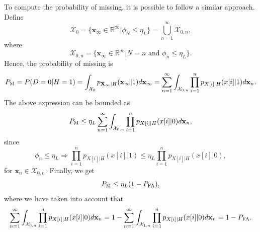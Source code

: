 To compute the probability of missing, it is possible to follow a similar approach. Define
\begin{equation*}
	\mathcal{X}_0 = \{ \mathbf{x}_{\infty} \in \mathbb{R}^{\infty} | \phi_{N} \leq  \eta_L  \} = \mathop{\bigcup}\limits_{n = 1}^{\infty} \mathcal{X}_{0,n},
\end{equation*}
where
\begin{equation*}
	\mathcal{X}_{0,n} = \{ \mathbf{x}_{\infty} \in \mathbb{R}^{\infty} |N = n \text{ and } \phi_{n} \leq  \eta_L  \}.
\end{equation*}
Hence, the probability of missing is
\begin{equation*}
	P_{\text{M}} = P(D = 0 | H = 1) = \int_{\mathcal{X}_0} p_{\mathbf{X}_{\infty} | H} (\mathbf{x}_{\infty} | 1) d \mathbf{x}_{\infty} = \sum_{n = 1}^{\infty}  \int_{\mathcal{X}_{0,n}} \prod_{i = 1}^{n} p_{X[i] | H}(x[i] | 1)  d \mathbf{x}_{n}.
\end{equation*}
The above expression can be bounded as
\begin{equation*}
	P_{\text{M}} \leq  \eta_L \sum_{n = 1}^{\infty}  \int_{\mathcal{X}_{0,n}}  \prod_{i = 1}^{n} p_{X[i] | H}(x[i] | 0)  d \mathbf{x}_{n},
\end{equation*}
since
\begin{equation*}
	\phi_n \leq \eta_L \Rightarrow   \prod_{i = 1}^{n} p_{X[i] | H}(x[i] | 1) \leq \eta_L \prod_{i = 1}^{n} p_{X[i] | H}(x[i] | 0),
\end{equation*}
for $\mathbf{x}_n \in \mathcal{X}_{0,n}$. Finally, we get
\begin{equation}
	\label{eq:bound_pm}
	P_{\text{M}} \leq  \eta_L (1 - P_{\text{FA}}),
\end{equation}
where we have taken into account that
\begin{equation*}
	\sum_{n = 1}^{\infty}  \int_{\mathcal{X}_{0,n}}  \prod_{i = 1}^{n} p_{X[i] | H}(x[i] | 0)  d \mathbf{x}_{n} = 1 - \sum_{n = 1}^{\infty}  \int_{\mathcal{X}_{1,n}}  \prod_{i = 1}^{n} p_{X[i] | H}(x[i] | 0)  d \mathbf{x}_{n} = 1 - P_{\text{FA}}.
\end{equation*}

